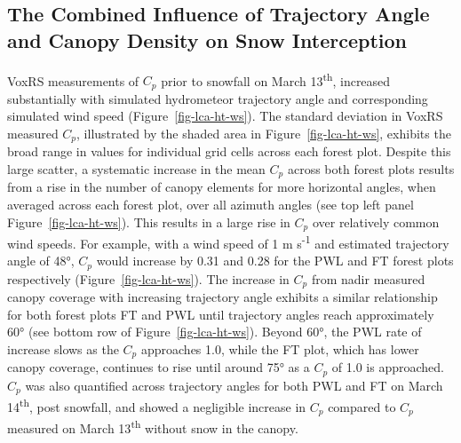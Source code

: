 \documentclass[
  letterpaper,
]{tex/uofsthesis-cs}
\begin{document}
\subsection{The Combined Influence of Trajectory Angle and Canopy
Density on Snow
Interception}\label{the-combined-influence-of-trajectory-angle-and-canopy-density-on-snow-interception}

VoxRS measurements of \(C_p\) prior to snowfall on March
13\textsuperscript{th}, increased substantially with simulated
hydrometeor trajectory angle and corresponding simulated wind speed
(Figure~\ref{fig-lca-ht-ws}). The standard deviation in VoxRS measured
\(C_p\), illustrated by the shaded area in Figure~\ref{fig-lca-ht-ws},
exhibits the broad range in values for individual grid cells across each
forest plot. Despite this large scatter, a systematic increase in the
mean \(C_p\) across both forest plots results from a rise in the number
of canopy elements for more horizontal angles, when averaged across each
forest plot, over all azimuth angles (see top left panel
Figure~\ref{fig-lca-ht-ws}). This results in a large rise in \(C_p\)
over relatively common wind speeds. For example, with a wind speed of 1
m s\textsuperscript{-1} and estimated trajectory angle of 48°, \(C_p\)
would increase by 0.31 and 0.28 for the PWL and FT forest plots
respectively (Figure~\ref{fig-lca-ht-ws}). The increase in \(C_p\) from
nadir measured canopy coverage with increasing trajectory angle exhibits
a similar relationship for both forest plots FT and PWL until trajectory
angles reach approximately 60° (see bottom row of
Figure~\ref{fig-lca-ht-ws}). Beyond 60°, the PWL rate of increase slows
as the \(C_p\) approaches 1.0, while the FT plot, which has lower canopy
coverage, continues to rise until around 75° as a \(C_p\) of 1.0 is
approached. \(C_p\) was also quantified across trajectory angles for
both PWL and FT on March 14\textsuperscript{th}, post snowfall, and
showed a negligible increase in \(C_p\) compared to \(C_p\) measured on
March 13\textsuperscript{th} without snow in the canopy.
\end{document}
